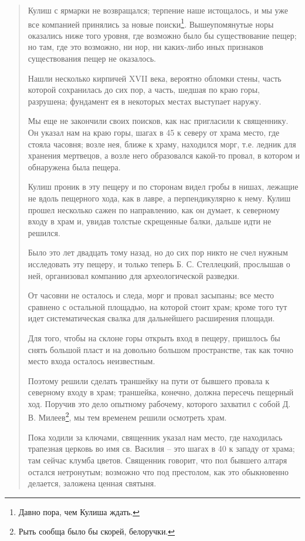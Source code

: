 \begin{quotation}
Кулиш с ярмарки не возвращался; терпение наше истощалось, и мы уже все компанией принялись за новые поиски\footnote{Давно пора, чем Кулиша ждать.}. Вышеупомянутые норы оказались ниже того уровня, где возможно было бы существование пещер; но там, где это возможно, ни нор, ни каких-либо иных признаков существования пещер не оказалось.

Нашли несколько кирпичей XVII века, вероятно обломки стены, часть которой сохранилась до сих пор, а часть, шедшая по краю горы, разрушена; фундамент ея в некоторых местах выступает наружу.

Мы еще не закончили своих поисков, как нас пригласили к священнику. Он указал нам на краю горы, шагах в 45 к северу от храма место, где стояла часовня; возле нея, ближе к храму, находился морг, т.е. ледник для хранения мертвецов, а возле него образовался какой-то провал, в котором и обнаружена была пещера.

Кулиш проник в эту пещеру и по сторонам видел гробы в нишах, лежащие не вдоль пещерного хода, как в лавре, а перпендикулярно к нему. Кулиш прошел несколько сажен по направлению, как он думает, к северному входу в храм и, увидав толстые скрещенные балки, дальше идти не решился.

Было это лет двадцать тому назад, но до сих пор никто не счел нужным исследовать эту пещеру, и только теперь Б. С. Стеллецкий, прослышав о ней, организовал компанию для археологической разведки.

От часовни не осталось и следа, морг и провал засыпаны; все место сравнено с остальной площадью, на которой стоит храм; кроме того тут идет систематическая свалка для дальнейшего расширения площади.

Для того, чтобы на склоне горы открыть вход в пещеру, пришлось бы снять большой пласт и на довольно большом пространстве, так как точно место входа осталось неизвестным.

Поэтому решили сделать траншейку на пути от бывшего провала к северному входу в храм; траншейка, конечно, должна пересечь пещерный ход. Поручив это дело опытному рабочему, которого захватил с собой Д. В. Милеев\footnote{Рыть сообща было бы скорей, белоручки.}, мы тем временем решили осмотреть храм.

Пока ходили за ключами, священник указал нам место, где находилась трапезная церковь во имя св. Василия – это шагах в 40 к западу от храма; там сейчас клумба цветов. Священник говорит, что пол бывшего алтаря остался нетронутым; возможно что под престолом, как это обыкновенно делается, заложена ценная святыня.


\end{quotation}
